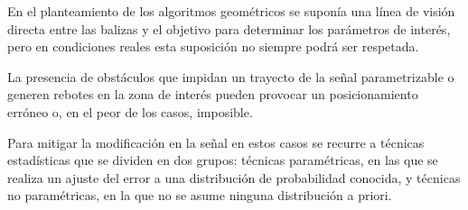 En el planteamiento de los algoritmos geométricos se suponía una línea de visión directa entre las balizas y el objetivo para determinar los parámetros de interés, pero en condiciones reales esta suposición no siempre podrá ser respetada.

La presencia de obstáculos que impidan un trayecto de la señal parametrizable o generen rebotes en la zona de interés pueden provocar un posicionamiento erróneo o, en el peor de los casos, imposible.

Para mitigar la modificación en la señal en estos casos se recurre a técnicas estadísticas que se dividen en dos grupos: técnicas paramétricas, en las que se realiza un ajuste del error a una distribución de probabilidad conocida, y técnicas no paramétricas, en la que no se asume ninguna distribución a priori.





